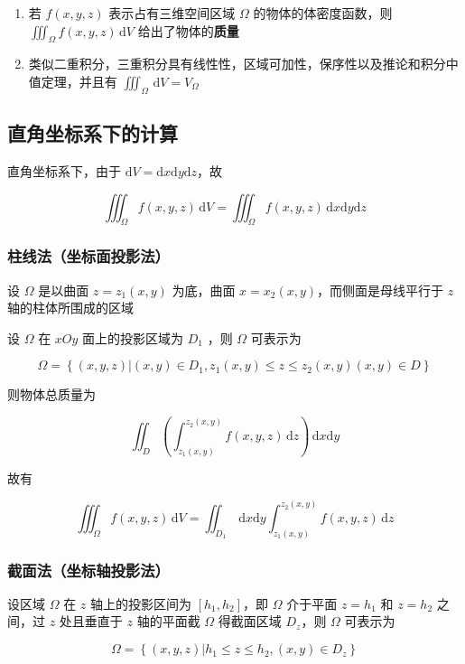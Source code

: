 \documentclass[lang = zh , final , oneside , openany , titlepage , zihao = -4 , linespread = 1.3 , baselineskip = false , cjk-font = windows , text-font = newtx , math-font = newtx , math-style = ISO , uppercase-greek = upright , integral-limits = false]{sjtureport}
\begin{document}
\begin{enumerate}
\item
  若 \(f(x,y,z)\) 表示占有三维空间区域 \(\Omega\) 的物体的体密度函数，则 \(\displaystyle\iiint_\Omega f(x,y,z)\,\mathrm{d}V\) 给出了物体的\textbf{质量}
\item
  类似二重积分，三重积分具有线性性，区域可加性，保序性以及推论和积分中值定理，并且有 \(\displaystyle\iiint_\Omega \,\mathrm{d}V = V_\Omega\)
\end{enumerate}

\subsection{直角坐标系下的计算}

直角坐标系下，由于 \(\mathrm{d}V=\mathrm{d}x\mathrm{d}y\mathrm{d}z\)，故

\[\iiint_\Omega f(x,y,z)\,\mathrm{d}V = \iiint_\Omega f(x,y,z)\,\mathrm{d}x\mathrm{d}y\mathrm{d}z\]

\subsubsection{柱线法（坐标面投影法）}

设 \(\Omega\) 是以曲面 \(z=z_1(x,y)\) 为底，曲面
\(x=x_2(x,y)\)，而侧面是母线平行于 \(z\) 轴的柱体所围成的区域

设 \(\Omega\) 在 \(xOy\) 面上的投影区域为 \(D_1\) ，则 \(\Omega\)
可表示为

\[\Omega = \left\{(x,y,z)\bigg| (x,y)\in D_1 , z_1(x,y)\leq z\leq z_2(x,y)(x,y)\in D\right\}\]

则物体总质量为

\[\iint_D\left(\int_{z_1(x,y)}^{z_2(x,y)}f(x,y,z)\,\mathrm{d}z\right) \,\mathrm{d}x\mathrm{d}y\]

故有

\[\iiint_\Omega f(x,y,z)\,\mathrm{d}V = \iint_{D_1} \,\mathrm{d}x\mathrm{d}y\int_{z_1(x,y)}^{z_2(x,y)} f(x,y,z)\,\mathrm{d}z\]

\subsubsection{截面法（坐标轴投影法）}

设区域 \(\Omega\) 在 \(z\) 轴上的投影区间为 \([h_1,h_2]\)，即 \(\Omega\)
介于平面 \(z=h_1\) 和 \(z=h_2\) 之间，过 \(z\) 处且垂直于 \(z\)
轴的平面截 \(\Omega\) 得截面区域 \(D_z\)，则 \(\Omega\) 可表示为

\[\Omega = \left\{(x,y,z)\bigg| h_1\leq z\leq h_2 , (x,y)\in D_z\right\}\]
\end{document}
